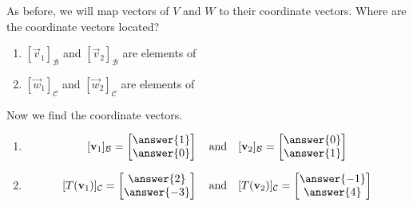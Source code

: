 \documentclass{ximera}
\begin{document}
\begin{exploration}
As before, we will map vectors of $V$ and $W$ to their coordinate vectors.  Where are the coordinate vectors located? 
\begin{enumerate}
    \item $[\vec{v}_1]_{\mathcal{B}}$ and $[\vec{v}_2]_{\mathcal{B}}$ are elements of 
     \item $[\vec{w}_1]_{\mathcal{C}}$ and $[\vec{w}_2]_{\mathcal{C}}$ are elements of 
\end{enumerate}
Now we find the coordinate vectors.
\begin{enumerate}
     \item 
     $$[\vec{v}_1]_{\mathcal{B}}=\begin{bmatrix}\answer{1}\\\answer{0}\end{bmatrix}\quad\text{and}\quad [\vec{v}_2]_{\mathcal{B}}=\begin{bmatrix}\answer{0}\\\answer{1}\end{bmatrix}$$
     \item 
     $$[T(\vec{v}_1)]_{\mathcal{C}}=\begin{bmatrix}\answer{2}\\\answer{-3}\end{bmatrix}\quad\text{and}\quad [T(\vec{v}_2)]_{\mathcal{C}}=\begin{bmatrix}\answer{-1}\\\answer{4}\end{bmatrix}$$
\end{enumerate}


\begin{expandable}
\begin{center}
\end{center}
\end{expandable}
\end{exploration}
\end{document}
